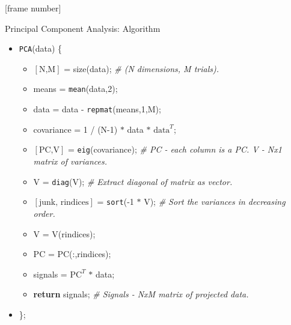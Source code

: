 \documentclass[aspectratio=169,t]{beamer}
\begin{document}
  {
    [frame number]
    \begin{frame}{Principal Component Analysis: Algorithm}
      \begin{itemize}
        \item \texttt{PCA}(data) \{
        \begin{itemize}
          \item $[\text{N,M}]$ = size(data); \emph{\color{gray}\# (N dimensions, M trials).}
          \item means = \texttt{mean}(data,2);
          \item data = data - \texttt{repmat}(means,1,M);
          \item covariance = 1 / (N-1) $\ast$ data $\ast$ $\text{data}^T$;
          \item $[\text{PC,V}]$ = \texttt{eig}(covariance); \emph{\color{gray}\# PC - each column is a PC. V - Nx1 matrix of variances.}
          \item V = \texttt{diag}(V); \emph{\color{gray}\# Extract diagonal of matrix as vector.}
          \item $[\text{junk, rindices}]$ = \texttt{sort}(-1 $\ast$ V); \emph{\color{gray}\# Sort the variances in decreasing order.}
          \item V  = V(rindices);
          \item PC = PC(:,rindices);
          \item signals = $\text{PC}^T$ $\ast$ data;
          \item \textbf{return} signals; \emph{\color{gray}\# Signals - NxM matrix of projected data.}
        \end{itemize}
        \item \};
      \end{itemize}
    \end{frame}
  }
\end{document}
